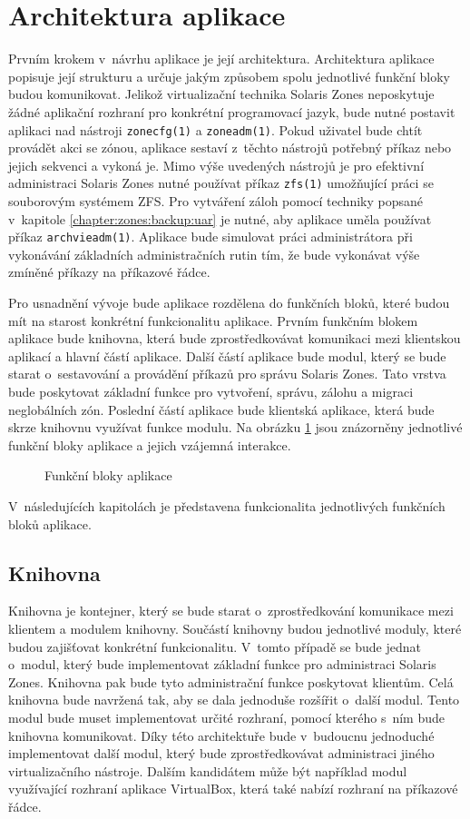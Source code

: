 \section{Architektura aplikace}
\label{chapter:design:architecture}
Prvním krokem v~návrhu aplikace je její architektura. Architektura aplikace popisuje její strukturu a určuje jakým způsobem
spolu jednotlivé funkční bloky budou komunikovat. Jelikož virtualizační technika Solaris Zones neposkytuje žádné aplikační rozhraní pro konkrétní
programovací jazyk, bude nutné postavit aplikaci nad nástroji \verb|zonecfg(1)| a \verb|zoneadm(1)|. Pokud uživatel bude chtít
provádět akci se zónou, aplikace sestaví z~těchto nástrojů potřebný příkaz nebo jejich sekvenci a vykoná je. Mimo výše
uvedených nástrojů je pro efektivní administraci Solaris Zones nutné používat příkaz \verb|zfs(1)| umožňující práci se souborovým
systémem ZFS. Pro vytváření záloh pomocí techniky popsané v~kapitole \ref{chapter:zones:backup:uar} je nutné, aby aplikace uměla
používat příkaz \verb|archvieadm(1)|. Aplikace bude simulovat práci administrátora při vykonávání základních administračních
rutin tím, že bude vykonávat výše zmíněné příkazy na příkazové řádce.

Pro usnadnění vývoje bude aplikace rozdělena do funkčních bloků, které budou mít na starost konkrétní funkcionalitu aplikace. Prvním
funkčním blokem aplikace bude knihovna, která bude zprostředkovávat komunikaci mezi klientskou aplikací a hlavní částí aplikace.
Další částí aplikace bude modul, který se bude starat o~sestavování a provádění příkazů pro správu Solaris Zones.
Tato vrstva bude poskytovat základní funkce pro vytvoření, správu, zálohu a migraci neglobálních zón. Poslední částí aplikace
bude klientská aplikace, která bude skrze knihovnu využívat funkce modulu. Na obrázku \ref{image:architecture} jsou znázorněny 
jednotlivé funkční bloky aplikace a jejich vzájemná interakce.
\begin{figure}
    \centering    
    \caption{Funkční bloky aplikace}
    \label{image:architecture}
\end{figure}
V~následujících kapitolách je představena funkcionalita jednotlivých funkčních bloků aplikace.
\subsection{Knihovna}
\label{chapter:design:architecture:library}
Knihovna je kontejner, který se bude starat o~zprostředkování komunikace mezi klientem a modulem knihovny. Součástí
knihovny budou jednotlivé moduly, které budou zajišťovat konkrétní funkcionalitu. V~tomto případě se bude jednat o~modul, který
bude implementovat základní funkce pro administraci Solaris Zones. Knihovna pak bude tyto administrační funkce poskytovat klientům.
Celá knihovna bude navržená tak, aby se dala jednoduše rozšířit o~další modul. Tento modul bude muset implementovat určité
rozhraní, pomocí kterého s~ním bude knihovna komunikovat. Díky této architektuře bude v~budoucnu jednoduché implementovat
další modul, který bude zprostředkovávat administraci jiného virtualizačního nástroje. Dalším kandidátem může být například
modul využívající rozhraní aplikace VirtualBox, která také nabízí rozhraní na příkazové řádce.

